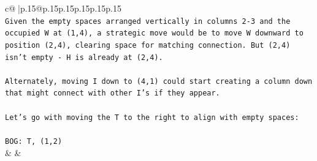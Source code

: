 \documentclass{article}
\begin{document}
{\begin{supertabular}{c@{$\;$}|p{.15\linewidth}@{}p{.15\linewidth}p{.15\linewidth}p{.15\linewidth}p{.15\linewidth}p{.15\linewidth}}
{{{\\ 
\texttt{Given the empty spaces arranged vertically in columns 2{-}3 and the occupied W at (1,4), a strategic move would be to move W downward to position (2,4), clearing space for matching connection. But (2,4) isn't empty {-} H is already at (2,4).} \\
\\ 
\texttt{Alternately, moving I down to (4,1) could start creating a column down that might connect with other I's if they appear.} \\
\\ 
\texttt{Let's go with moving the T to the right to align with empty spaces:} \\
\\ 
\texttt{BOG: T, (1,2)} \\
            }
        }
    }
    & & \\ \\


\end{supertabular}}
\end{document}
